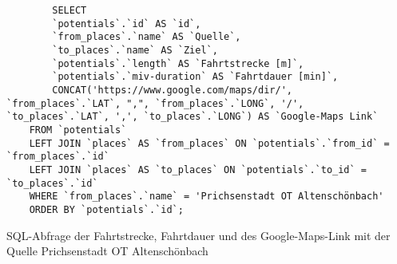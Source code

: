 \begin{listing}[htbp]
    \begin{verbatim}
        SELECT 
        `potentials`.`id` AS `id`, 
        `from_places`.`name` AS `Quelle`,
        `to_places`.`name` AS `Ziel`, 
        `potentials`.`length` AS `Fahrtstrecke [m]`, 
        `potentials`.`miv-duration` AS `Fahrtdauer [min]`,
        CONCAT('https://www.google.com/maps/dir/', `from_places`.`LAT`, ",", `from_places`.`LONG`, '/', `to_places`.`LAT`, ',', `to_places`.`LONG`) AS `Google-Maps Link`
    FROM `potentials`
    LEFT JOIN `places` AS `from_places` ON `potentials`.`from_id` = `from_places`.`id`
    LEFT JOIN `places` AS `to_places` ON `potentials`.`to_id` = `to_places`.`id`
    WHERE `from_places`.`name` = 'Prichsenstadt OT Altenschönbach'
    ORDER BY `potentials`.`id`;
    \end{verbatim}
    \caption{SQL-Abfrage der Fahrtstrecke, Fahrtdauer und des Google-Maps-Link mit der Quelle Prichsenstadt OT Altenschönbach}\label{lst-f-altenschoenbach}
\end{listing}